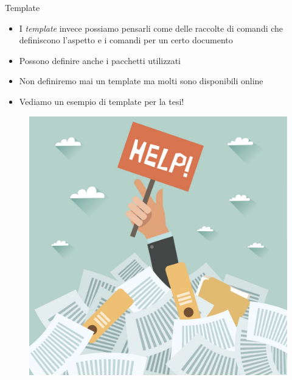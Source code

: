\begin{frame}{Template}

\begin{itemize}
\item I \emph{template} invece possiamo pensarli come delle raccolte di comandi
che definiscono l'aspetto e i comandi per un certo documento
\item Possono definire anche i pacchetti utilizzati
\item Non definiremo mai un template ma molti sono disponibili online
\item Vediamo un esempio di template per la tesi!
\end{itemize}

\begin{figure}
	\centering
	\includegraphics[scale=0.20]{res/images/template}
\end{figure}

\end{frame}
